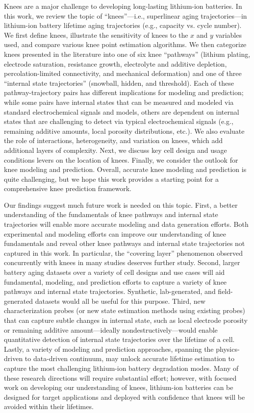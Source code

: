 \documentclass[journal=jpclcd,manuscript=article]{achemso}
\begin{document}
Knees are a major challenge to developing long-lasting lithium-ion batteries.
In this work, we review the topic of ``knees''---i.e., superlinear aging trajectories---in lithium-ion battery lifetime aging trajectories (e.g., capacity vs. cycle number). We first define knees, illustrate the sensitivity of knees to the $x$ and $y$ variables used, and compare various knee point estimation algorithms. We then categorize knees presented in the literature into one of six knee ``pathways'' (lithium plating, electrode saturation, resistance growth, electrolyte and additive depletion, percolation-limited connectivity, and mechanical deformation) and one of three ``internal state trajectories'' (snowball, hidden, and threshold). Each of these pathway-trajectory pairs has different implications for modeling and prediction; while some pairs have internal states that can be measured and modeled via standard electrochemical signals and models, others are dependent on internal states that are challenging to detect via typical electrochemical signals (e.g., remaining additive amounts, local porosity distributions, etc.). We also evaluate the role of interactions, heterogeneity, and variation on knees, which add additional layers of complexity. Next, we discuss key cell design and usage conditions levers on the location of knees. Finally, we consider the outlook for knee modeling and prediction. Overall, accurate knee modeling and prediction is quite challenging, but we hope this work provides a starting point for a comprehensive knee prediction framework.

Our findings suggest much future work is needed on this topic.
First, a better understanding of the fundamentals of knee pathways and internal state trajectories will enable more accurate modeling and data generation efforts. Both experimental and modeling efforts can improve our understanding of knee fundamentals and reveal other knee pathways and internal state trajectories not captured in this work.
In particular, the ``covering layer'' phenomenon observed concurrently with knees in many studies deserves further study.
Second, larger battery aging datasets over a variety of cell designs and use cases will aid fundamental, modeling, and prediction efforts to capture a variety of knee pathways and internal state trajectories. Synthetic, lab-generated, and field-generated datasets would all be useful for this purpose.
Third, new characterization probes (or new state estimation methods using existing probes) that can capture subtle changes in internal state, such as local electrode porosity or remaining additive amount---ideally nondestructively---would enable quantitative detection of internal state trajectories over the lifetime of a cell.
Lastly, a variety of modeling and prediction approaches, spanning the physics-driven to data-driven continuum, may unlock accurate lifetime estimation to capture the most challenging lithium-ion battery degradation modes.
Many of these research directions will require substantial effort; however, with focused work on developing our understanding of knees, lithium-ion batteries can be designed for target applications and deployed with confidence that knees will be avoided within their lifetimes. 
\end{document}
